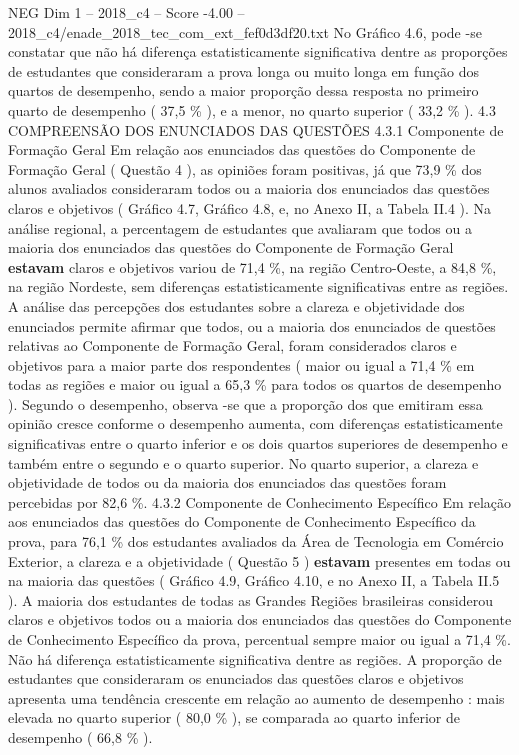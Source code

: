 \begin{textsample}{NEG Dim 1 – 2018\_c4 – Score -4.00 – 2018\_c4/enade\_2018\_tec\_com\_ext\_fef0d3df20.txt}
No Gráfico 4.6, pode -se constatar que não há diferença estatisticamente significativa dentre as proporções de estudantes que consideraram a prova longa ou muito longa em função dos quartos de desempenho, sendo a maior proporção dessa resposta no primeiro quarto de desempenho ( 37,5 \% ), e a menor, no quarto superior ( 33,2 \% ). 4.3 COMPREENSÃO DOS ENUNCIADOS DAS QUESTÕES 4.3.1 Componente de Formação Geral Em relação aos enunciados das questões do Componente de Formação Geral ( Questão 4 ), as opiniões foram positivas, já que 73,9 \% dos alunos avaliados consideraram todos ou a maioria dos enunciados das questões claros e objetivos ( Gráfico 4.7, Gráfico 4.8, e, no Anexo II, a Tabela II.4 ).
Na análise regional, a percentagem de estudantes que avaliaram que todos ou a maioria dos enunciados das questões do Componente de Formação Geral \textbf{estavam} claros e objetivos variou de 71,4 \%, na região Centro-Oeste, a 84,8 \%, na região Nordeste, sem diferenças estatisticamente significativas entre as regiões.
A análise das percepções dos estudantes sobre a clareza e objetividade dos enunciados permite afirmar que todos, ou a maioria dos enunciados de questões relativas ao Componente de Formação Geral, foram considerados claros e objetivos para a maior parte dos respondentes ( maior ou igual a 71,4 \% em todas as regiões e maior ou igual a 65,3 \% para todos os quartos de desempenho ).
Segundo o desempenho, observa -se que a proporção dos que emitiram essa opinião cresce conforme o desempenho aumenta, com diferenças estatisticamente significativas entre o quarto inferior e os dois quartos superiores de desempenho e também entre o segundo e o quarto superior.
No quarto superior, a clareza e objetividade de todos ou da maioria dos enunciados das questões foram percebidas por 82,6 \%. 4.3.2 Componente de Conhecimento Específico Em relação aos enunciados das questões do Componente de Conhecimento Específico da prova, para 76,1 \% dos estudantes avaliados da Área de Tecnologia em Comércio Exterior, a clareza e a objetividade ( Questão 5 ) \textbf{estavam} presentes em todas ou na maioria das questões ( Gráfico 4.9, Gráfico 4.10, e no Anexo II, a Tabela II.5 ).
A maioria dos estudantes de todas as Grandes Regiões brasileiras considerou claros e objetivos todos ou a maioria dos enunciados das questões do Componente de Conhecimento Específico da prova, percentual sempre maior ou igual a 71,4 \%.
Não há diferença estatisticamente significativa dentre as regiões.
A proporção de estudantes que consideraram os enunciados das questões claros e objetivos apresenta uma tendência crescente em relação ao aumento de desempenho : mais elevada no quarto superior ( 80,0 \% ), se comparada ao quarto inferior de desempenho ( 66,8 \% ).

\end{textsample}
